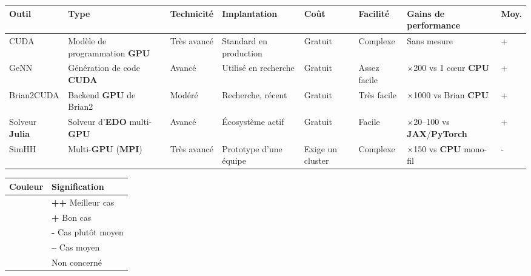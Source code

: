 {\setlength{\tabcolsep}{3pt}\footnotesize
\begin{tabular}{|p{1.8cm}|p{1.5cm}|p{1.5cm}|p{1.85cm}|p{1.05cm}|p{1.35cm}|p{2.1cm}|p{0.95cm}|}
\hline
\rowcolor{gray!15}
\scriptsize\textbf{Outil} & \scriptsize\textbf{Type} & \scriptsize\textbf{Technicité} & \scriptsize\textbf{Implantation} & \scriptsize\textbf{Coût} & \scriptsize\textbf{Facilité} & \scriptsize\textbf{Gains de performance} & \scriptsize\textbf{Moy.} \\ \hline

CUDA \cite{nickolls2008} & Modèle de programmation \textbf{GPU} &
\cellcolor{bmBest}Très avancé &
\cellcolor{bmBest}Standard en production &
\cellcolor{bmBest}Gratuit &
\cellcolor{bmLow}Complexe &
Sans mesure &
\cellcolor{bmGood}+ \\ \hline

GeNN \cite{yavuz2016} & Génération de code \textbf{CUDA} &
\cellcolor{bmGood}Avancé &
\cellcolor{bmGood}Utilisé en recherche &
\cellcolor{bmBest}Gratuit &
\cellcolor{bmGood}Assez facile &
\cellcolor{bmGood}$\times$200 vs 1 cœur \textbf{CPU} &
\cellcolor{bmGood}+ \\ \hline

Brian2CUDA \cite{alevi2022} & Backend \textbf{GPU} de Brian2 &
\cellcolor{bmMid}Modéré &
\cellcolor{bmMid}Recherche, récent &
\cellcolor{bmBest}Gratuit &
\cellcolor{bmBest}Très facile &
\cellcolor{bmBest}$\times$1000 vs Brian \textbf{CPU} &
\cellcolor{bmGood}+ \\ \hline

Solveur \textbf{Julia} \cite{utkarsh2024} & Solveur d'\textbf{EDO} multi-\textbf{GPU} &
\cellcolor{bmGood}Avancé &
\cellcolor{bmGood}Écosystème actif &
\cellcolor{bmBest}Gratuit &
\cellcolor{bmGood}Facile &
\cellcolor{bmBest}$\times$20--100 vs \textbf{JAX}/\allowbreak\textbf{PyTorch} &
\cellcolor{bmGood}+ \\ \hline

SimHH \cite{engelen2025} & Multi-\textbf{GPU} (\textbf{MPI}) &
\cellcolor{bmBest}Très avancé &
\cellcolor{bmMid}Prototype d'une équipe &
\cellcolor{bmLow}Exige un cluster &
\cellcolor{bmLow}Complexe &
\cellcolor{bmBest}$\times$150 vs \textbf{CPU} mono-fil &
\cellcolor{bmMid}- \\ \hline

\end{tabular}}

\medskip

\begin{tabular}{|p{1.5cm}|p{6cm}|}
\hline
\textbf{Couleur} & \textbf{Signification} \\ \hline
\cellcolor{bmBest} & \textbf{++} Meilleur cas \\ \hline
\cellcolor{bmGood} & \textbf{+} Bon cas \\ \hline
\cellcolor{bmMid} & \textbf{-} Cas plutôt moyen \\ \hline
\cellcolor{bmLow} & \textbf{--} Cas moyen \\ \hline
& Non concerné \\ \hline
\end{tabular}

